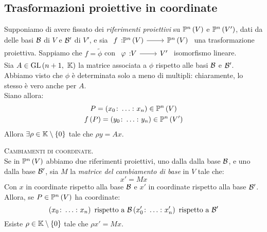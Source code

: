 \subsection{Trasformazioni proiettive in coordinate}
Supponiamo di avere fissato dei \textit{riferimenti proiettivi} su $\proj{V}$ e $\proj{V'}$, dati da delle basi $\mathcal{B}$ di $V$ e $\mathcal{B}'$ di $V'$, e sia $\funz{f}{\proj{V}}{\proj{V}}$ una trasformazione proiettiva. Sappiamo che $f=\widetilde{\phi}$ con $\funz{\phi}{V}{V'}$ isomorfismo lineare.\\
Sia $A\in\operatorname{GL}\left(n+1,\ \mathbb{K}\right)$ la matrice associata a $\phi$ rispetto alle basi $\mathcal{B}$ e $\mathcal{B}'$. Abbiamo visto che $\phi$ è determinata solo a meno di multipli: chiaramente, lo stesso è vero anche per $A$.\\
Siano allora:
\begin{gather*}
	P=\left(x_0\colon\ldots\colon x_n\right)\in\proj{V}\\
	f\left(P\right)=\left(y_0\colon\ldots\colon y_n\right)\in\proj{V'}
\end{gather*}
Allora $\exists\rho\in\mathbb{K}\setminus\left\{0\right\}$ tale che $\rho y=Ax$.
\begin{observe}\textsc{Cambiamenti di coordinate.}\\
Se in $\proj{V}$ abbiamo due riferimenti proiettivi, uno dalla dalla base $\mathcal{B}$, e uno dalla base $\mathcal{B}'$, sia $M$ la \textit{matrice del cambiamento di base} in $V$ tale che:
\begin{equation*}
	x'=Mx
\end{equation*}
Con $x$ in coordinate rispetto alla base $\mathcal{B}$ e $x'$ in coordinate rispetto alla base $\mathcal{B}'$. Allora, se $P\in\proj{V}$ ha coordinate:
\begin{equation*}
	\left(x_0\colon\ldots\colon x_n\right)\text{ rispetto a }\mathcal{B}\\
	\left(x_0'\colon\ldots\colon x_n'\right)\text{ rispetto a }\mathcal{B}'
\end{equation*}
Esiste $\rho\in\mathbb{K}\setminus\left\{0\right\}$ tale che $\rho x'=M x$.
\end{observe}
